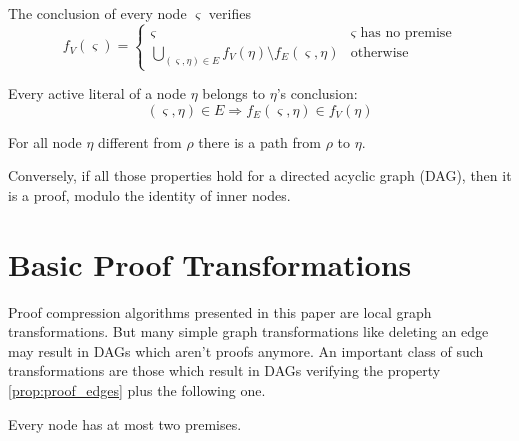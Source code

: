 \documentclass{llncs}
\begin{document}
\begin{property}
\label{prop:proof_conclusion}
The conclusion of every node $\varsigma$ verifies
\begin{equation*}
  f_V(\varsigma) = \begin{cases}
    \varsigma & \varsigma \text{ has no premise} \\
    \bigcup_{(\varsigma,\eta) \in E}{f_V(\eta) \setminus f_E(\varsigma,\eta)} & \text{otherwise}
  \end{cases}
\end{equation*}
\end{property}

\begin{property}
Every active literal of a node $\eta$ belongs to $\eta$'s conclusion:
\begin{equation*}
  (\varsigma,\eta) \in E \Rightarrow f_E(\varsigma,\eta) \in f_V(\eta)
\end{equation*}
\end{property}

\begin{property}
For all node $\eta$ different from $\rho$ there is a path from $\rho$ to $\eta$.
\end{property}

Conversely, if all those properties hold for a directed acyclic graph (DAG), then it is a proof,
modulo the identity of inner nodes.

\section{Basic Proof Transformations}


Proof compression algorithms presented in this paper are local graph transformations.  But many
simple graph transformations like deleting an edge may result in DAGs which aren't proofs anymore.
An important class of such transformations are those which result in DAGs verifying the property
\ref{prop:proof_edges} plus the following one.

\begin{property}
\label{prop:pseudo-proof}
Every node has at most two premises.
\end{property}
\end{document}
